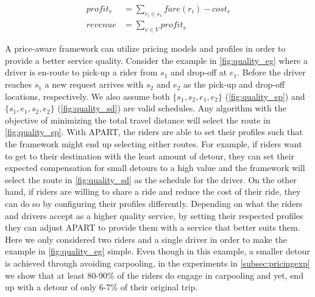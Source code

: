 \begin{align}
\label{eq:profit} 
profit_v &= \sum_{r_i \in s_v}fare(r_i) - cost_v\\
revenue &= \sum_{v \in V}profit_v
\end{align}

A price-aware framework can utilize pricing models and profiles in order to provide a better service quality. Consider the example in \cref{fig:quality_eg} where a driver is en-route to pick-up a rider from $s_1$ and drop-off at $e_1$. Before the driver reaches $s_1$ a new request arrives with $s_2$ and $e_2$ as the pick-up and drop-off locations, respectively. We also assume both $\lbrace s_1, s_2, e_1, e_2 \rbrace$ (\cref{fig:quality_sp}) and $\lbrace s_1, e_1, s_2, e_2 \rbrace$ (\cref{fig:quality_sd}) are valid schedules. Any algorithm with the objective of minimizing the total travel distance will select the route in \cref{fig:quality_sp}. With APART, the riders are able to set their profiles such that the framework might end up selecting either routes. For example, if riders want to get to their destination with the least amount of detour, they can set their expected compensation for small detours to a high value and the framework will select the route in \cref{fig:quality_sd} as the schedule for the driver. On the other hand, if riders are willing to share a ride and reduce the cost of their ride, they can do so by configuring their profiles differently. Depending on what the riders and drivers accept as a higher quality service, by setting their respected profiles they can adjust APART to provide them with a service that better suits them. Here we only considered two riders and a single driver in order to make the example in \cref{fig:quality_eg} simple. Even though in this example, a smaller detour is achieved through avoiding carpooling, in the experiments in \cref{subsec:pricingexp} we show that at least 80-90\% of the riders do engage in carpooling and yet, end up with a detour of only 6-7\% of their original trip.

